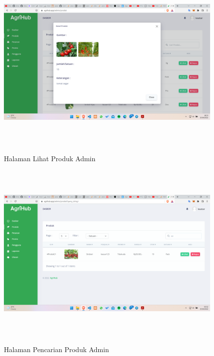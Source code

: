 \begin{enumerate}
\begin{enumerate}
			\begin{figure}[H]
				\centering
				{\includegraphics [width = 14.3cm, height= 9cm]{gambar/admin/lihat_produk_admin}}
				\caption{Halaman Lihat Produk Admin}
				\label{lihat_produk_admin}
			\end{figure}

			\begin{figure}[H]
				\centering
				{\includegraphics [width = 14.3cm, height= 9cm]{gambar/admin/pencarian_produk_admin}}
				\caption{Halaman Pencarian Produk Admin}
				\label{pencarian_produk_admin}
			\end{figure}


\end{enumerate}
\end{enumerate}
